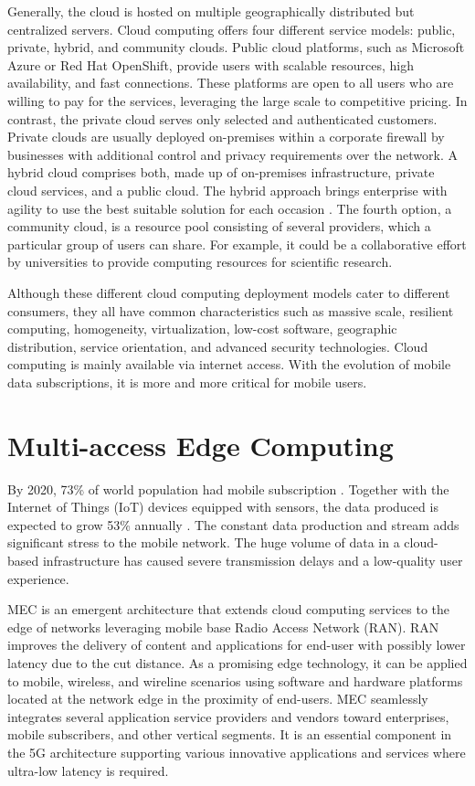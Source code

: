 Generally, the cloud is hosted on multiple geographically distributed but centralized servers. Cloud computing offers four different service models: public, private, hybrid, and community clouds. Public cloud platforms, such as Microsoft Azure or Red Hat OpenShift, provide users with scalable resources, high availability, and fast connections. These platforms are open to all users who are willing to pay for the services, leveraging the large scale to competitive pricing. In contrast, the private cloud serves only selected and authenticated customers. Private clouds are usually deployed on-premises within a corporate firewall by businesses with additional control and privacy requirements over the network. A hybrid cloud comprises both, made up of on-premises infrastructure, private cloud services, and a public cloud. The hybrid approach brings enterprise with agility to use the best suitable solution for each occasion \cite{NetApp}. The fourth option, a community cloud, is a resource pool consisting of several providers, which a particular group of users can share. For example, it could be a collaborative effort by universities to provide computing resources for scientific research. \cite{MicrosoftAzure}\cite{Taleb2017}\cite{Xing2012}

Although these different cloud computing deployment models cater to different consumers, they all have common characteristics such as massive scale, resilient computing, homogeneity, virtualization, low-cost software, geographic distribution, service orientation, and advanced security technologies. Cloud computing is mainly available via internet access. With the evolution of mobile data subscriptions, it is more and more critical for mobile users.

\section{Multi-access Edge Computing}

By 2020, 73\% of world population had mobile subscription \cite{StatistaMobileSubscribers}. Together with the Internet of Things (IoT) devices equipped with sensors, the data produced is expected to grow 53\% annually \cite{Ning2019}. The constant data production and stream adds significant stress to the mobile network. The huge volume of data in a cloud-based infrastructure has caused severe transmission delays and a low-quality user experience.

MEC is an emergent architecture that extends cloud computing services to the edge of networks leveraging mobile base Radio Access Network (RAN). RAN improves the delivery of content and applications for end-user with possibly lower latency due to the cut distance. As a promising edge technology, it can be applied to mobile, wireless, and wireline scenarios using software and hardware platforms located at the network edge in the proximity of end-users. MEC seamlessly integrates several application service providers and vendors toward enterprises, mobile subscribers, and other vertical segments. It is an essential component in the 5G architecture supporting various innovative applications and services where ultra-low latency is required. \cite{Abbas2018}

